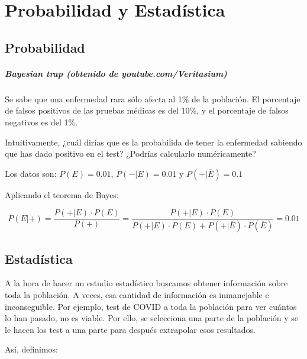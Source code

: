 \chapter{Probabilidad y Estadística}

\section{Probabilidad}


\paragraph{Bayesian trap (obtenido de youtube.com/Veritasium)}

\begin{example}
Se sabe que una enfermedad rara sólo afecta al 1\% de la población. 
%
El porcentaje de falsos positivos de las pruebas médicas es del 10\%, y el porcentaje de falsos negativos es del 1\%.

Intuitivamente, ¿cuál dirías que es la probabilida de tener la enfermedad sabiendo que has dado positivo en el test? ¿Podrías calcularlo numéricamente?

Los datos son: $P(E) = 0.01$, $P(-|E) = 0.01$ y $P(+|\overline{E})=0.1$

Aplicando el teorema de Bayes:

\[P(E|+) = \frac{P(+|E)·P(E)}{P(+)} = \frac{P(+|E)·P(E)}{P(+|E)·P(E) + P(+|\overline{E})·P(\overline{E})}= 0.01 \]
\end{example}


\section{Estadística}

A la hora de hacer un estudio estadístico buscamos obtener información sobre toda la población. A veces, esa cantidad de información es inmanejable e inconseguible. 
%
Por ejemplo, test de COVID a toda la población para ver cuántos lo han pasado, no es viable. 
%
Por ello, se selecciona una parte de la población y se le hacen los test a una parte para después extrapolar esos resultados.

Así, definimos:

\begin{defn}[Población]
\end{defn}

\begin{defn}[Muestra]
\end{defn}

